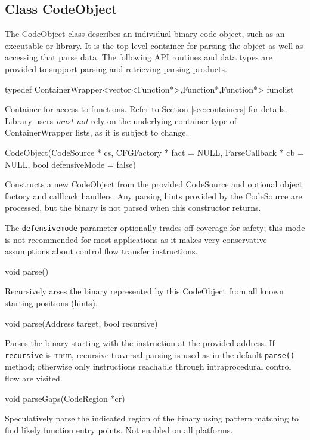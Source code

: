 \documentclass{article}
\newenvironment{apient}{\small\verbatim}{\endverbatim}
\newcommand{\apidesc}[1]{%
{\addtolength{\leftskip}{4em}%
#1\par\medskip}
}
\begin{document}
\subsection{Class CodeObject}

The CodeObject class describes an individual binary code object, such as an
executable or library. It is the top-level container for parsing the object as
well as accessing that parse data. The following API routines and data types
are provided to support parsing and retrieving parsing products.

\begin{apient}
typedef ContainerWrapper<vector<Function*>,Function*,Function*> funclist
\end{apient}
\apidesc{Container for access to functions. Refer to Section \ref{sec:containers} for details. Library users \emph{must not} rely on the underlying container type of ContainerWrapper lists, as it is subject to change.}

\begin{apient}
CodeObject(CodeSource * cs,
    CFGFactory * fact = NULL,
    ParseCallback * cb = NULL,
    bool defensiveMode = false)
\end{apient}
\apidesc{Constructs a new CodeObject from the provided CodeSource and
optional object factory and callback handlers. Any parsing hints provided
by the CodeSource are processed, but the binary is not parsed when this
constructor returns.

\medskip\noindent The \texttt{defensivemode}
parameter optionally trades off coverage for safety; this mode is not
recommended for most applications as it makes very conservative assumptions
about control flow transfer instructions.}

\begin{apient}
void parse()
\end{apient}
\apidesc{Recursively arses the binary represented by this CodeObject from all
known starting positions (hints).}

\begin{apient}
void parse(Address target, bool recursive)
\end{apient}
\apidesc{Parses the binary starting with the instruction at the provided address. If \texttt{recursive} is {\scshape true}, recursive traversal parsing is used as in the default \texttt{parse()} method; otherwise only instructions reachable through intraprocedural control flow are visited.}

\begin{apient}
void parseGaps(CodeRegion *cr)
\end{apient}
\apidesc{Speculatively parse the indicated region of the binary using pattern matching to find likely function entry points. Not enabled on all platforms.}
\end{document}
